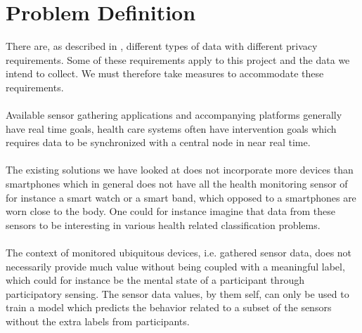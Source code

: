 
\section{Problem Definition} 
\label{sec:problem_definition}
There are, as described in , different types of data with different privacy requirements. Some of these requirements apply to this project and the data we intend to collect. We must therefore take measures to accommodate these requirements.    
\\\\
Available sensor gathering applications and accompanying platforms generally have real time goals, health care systems often have intervention goals which requires data to be synchronized with a central node in near real time. 
\\\\
The existing solutions we have looked at does not incorporate more devices than smartphones which in general does not have all the health monitoring sensor of for instance a smart watch or a smart band, which opposed to a smartphones are worn close to the body. One could for instance imagine that data from these sensors to be interesting in various health related classification problems. 
\\\\
The context of monitored ubiquitous devices, i.e. gathered sensor data, does not necessarily provide much value without being coupled with a meaningful label, which could for instance be the mental state of a participant through participatory sensing. The sensor data values, by them self, can only be used to train a model which predicts the behavior related to a subset of the sensors without the extra labels from participants. 


